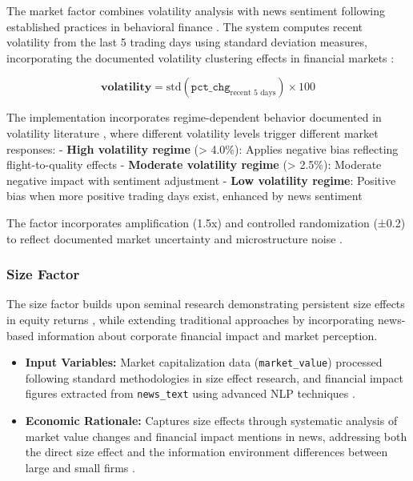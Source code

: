 \documentclass[3p,times,procedia]{elsarticle}
\begin{document}
The market factor combines volatility analysis with news sentiment following established practices in behavioral finance \cite{Daniel1998}. The system computes recent volatility from the last 5 trading days using standard deviation measures, incorporating the documented volatility clustering effects in financial markets \cite{Engle1982}:

\begin{equation}
\textbf{volatility} = \text{std}(\texttt{pct\_chg}_{\text{recent 5 days}}) \times 100
\end{equation}

The implementation incorporates regime-dependent behavior documented in volatility literature \cite{Glosten1993}, where different volatility levels trigger different market responses:
- \textbf{High volatility regime} (> 4.0\%): Applies negative bias reflecting flight-to-quality effects
- \textbf{Moderate volatility regime} (> 2.5\%): Moderate negative impact with sentiment adjustment  
- \textbf{Low volatility regime}: Positive bias when more positive trading days exist, enhanced by news sentiment

The factor incorporates amplification (1.5x) and controlled randomization (±0.2) to reflect documented market uncertainty and microstructure noise \cite{Campbell2001}.

\subsubsection{{Size Factor}}

The size factor builds upon seminal research demonstrating persistent size effects in equity returns \cite{Banz1981}, while extending traditional approaches by incorporating news-based information about corporate financial impact and market perception.

\begin{itemize}
    \item \textbf{Input Variables:} Market capitalization data (\texttt{market\_value}) processed following standard methodologies in size effect research, and financial impact figures extracted from \texttt{news\_text} using advanced NLP techniques \cite{Loughran2011}.
    \item \textbf{Economic Rationale:} Captures size effects through systematic analysis of market value changes and financial impact mentions in news, addressing both the direct size effect and the information environment differences between large and small firms \cite{Banz1981}.
\end{itemize}
\end{document}
